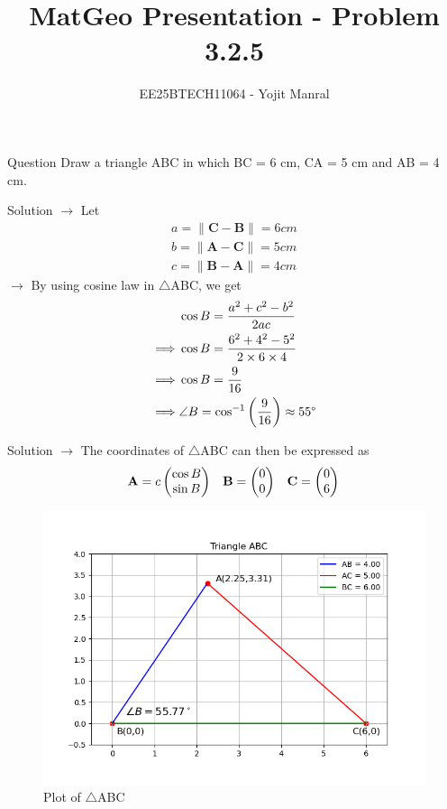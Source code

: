 \documentclass{beamer}
\title{MatGeo Presentation - Problem 3.2.5}
\author{EE25BTECH11064 - Yojit Manral}
\date{}
\numberwithin{equation}{section}
\providecommand{\brak}[1]{\ensuremath{\left(#1\right)}}
\theoremstyle{remark}
\providecommand{\norm}[1]{\lVert#1\rVert}
\newcommand{\myvec}[1]{\ensuremath{\begin{pmatrix}#1\end{pmatrix}}}
\let\vec\mathbf
\begin{document}
\frame{\titlepage}
\begin{frame}{Question}
Draw a triangle ABC in which BC = 6 cm, CA = 5 cm and AB = 4 cm.\\
\end{frame}

\begin{frame}{Solution}
$\rightarrow$ Let
\begin{align}
    a = \norm{\vec{C} - \vec{B}} = 6 cm \\
    b = \norm{\vec{A} - \vec{C}} = 5 cm \\
    c = \norm{\vec{B} - \vec{A}} = 4 cm
\end{align}
$\rightarrow$ By using cosine law in $\triangle$ABC, we get
\begin{align}
    &\cos{B} = \frac{a^{2} + c^{2} - b^{2}}{2ac} \\
    \implies &\cos{B} = \frac{6^2 + 4^2 - 5^2}{2 \times 6 \times 4} \\
    \implies &\cos{B} = \frac{9}{16} \\
    \implies &\angle{B} = \cos^{-1}{\brak{\frac{9}{16}}} \approx 55 \degree
\end{align}
\end{frame}

\begin{frame}{Solution}
$\rightarrow$ The coordinates of $\triangle$ABC can then be expressed as
\begin{align}
    \vec{A} = c \myvec{\cos{B}\\\sin{B}} &&
    \vec{B} = \myvec{0\\0} &&
    \vec{C} = \myvec{0\\6} \notag
\end{align}

\begin{figure}[h!]
   \centering
   \includegraphics[width=0.6\linewidth]{figs/01.png}
   \caption{Plot of $\triangle$ABC}
   \label{Plot_1}
\end{figure}
\end{frame}
\end{document}
